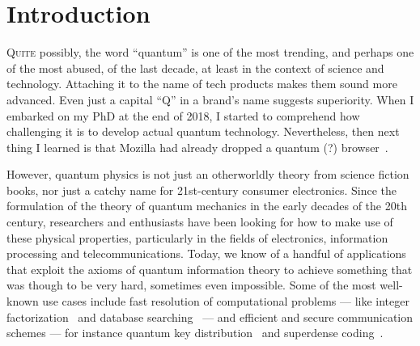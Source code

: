 \chapter{Introduction}
\label{chp:intro}

\lettrine{Q}{uite} possibly, the word ``quantum'' is one of the most trending, and perhaps one of
the most abused, of the last decade, at least in the context of science and technology. Attaching it
to the name of tech products makes them sound more advanced. Even just a capital ``Q'' in a brand's
name suggests superiority. When I embarked on my PhD at the end of 2018, I started to comprehend how
challenging it is to develop actual quantum technology. Nevertheless, then next thing I learned is
that Mozilla had already dropped a quantum (?) browser~\cite{firefox_quantum}.

However, quantum physics is not just an otherworldly theory from science fiction books, nor just a
catchy name for 21st-century consumer electronics. Since the formulation of the theory of quantum
mechanics in the early decades of the 20th century, researchers and enthusiasts have been looking
for how to make use of these physical properties, particularly in the fields of electronics,
information processing and telecommunications. Today, we know of a handful of applications that
exploit the axioms of quantum information theory to achieve something that was though to be very
hard, sometimes even impossible. Some of the most well-known use cases include fast resolution of
computational problems --- like integer factorization~\cite{shor_1994_algorithms} and database
searching~\cite{grover_1996_search} --- and efficient and secure communication schemes --- for
instance quantum key distribution~\cite{bennett_2014_bb84, ekert_1991_e91} and superdense
coding~\cite{bennett_1992_communication}.

